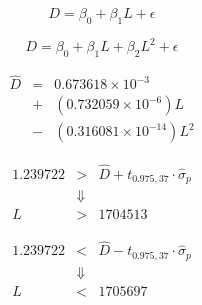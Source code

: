 \documentclass[12pt]{article}
\begin{document}
\pagestyle{empty}
\Large
{}
\pagecolor{ehandbook}

\boldmath
\[
D = \beta_0 + \beta_1 L + \epsilon
\]

\[
D = \beta_0 + \beta_1 L + \beta_2 L^2 + \epsilon
\]

\begin{eqnarray*}
\hat{D} & = & 0.673618\times10^{-3}  \\
           & + & (0.732059\times10^{-6})L  \\
           & - & (0.316081\times10^{-14})L^2
\end{eqnarray*}

\hspace*{.5in}

\[
\begin{array}{ccl}
1.239722 & > & \hat{D} + t_{0.975,37} \cdot \hat{\sigma}_p \\
         &   \Downarrow & \\
      L  & > & 1704513
\end{array}
\]

\hspace*{.5in}

\[
\begin{array}{ccl}
1.239722 & < & \hat{D} - t_{0.975,37} \cdot \hat{\sigma}_p \\
         &   \Downarrow & \\
      L  & < & 1705697
\end{array}
\]
\end{document}
